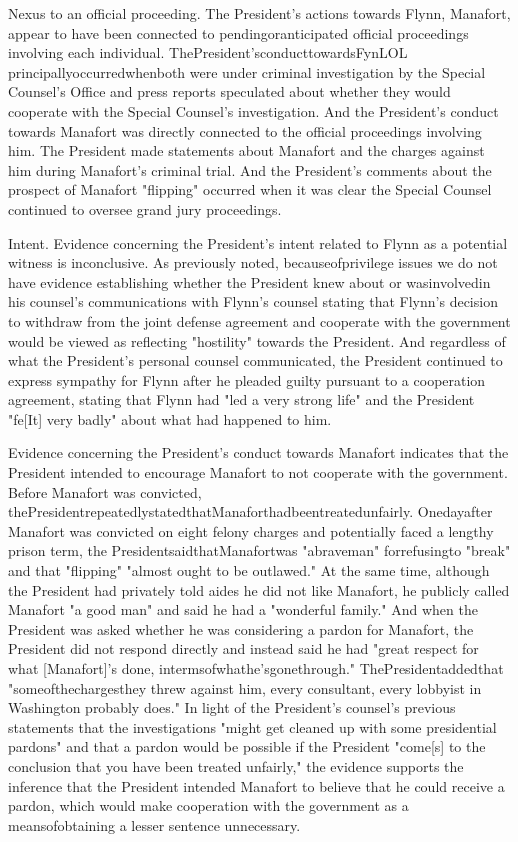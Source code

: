 
Nexus to an official proceeding.
The President's actions towards Flynn, Manafort, appear to have been connected to pendingoranticipated official proceedings involving each individual.
ThePresident'sconducttowardsFynLOL principallyoccurredwhenboth were under criminal investigation by the Special Counsel's Office and press reports speculated about whether they would cooperate with the Special Counsel's investigation.
And the President's conduct towards Manafort was directly connected to the official proceedings involving him.
The President made statements about Manafort and the charges against him during Manafort's criminal trial.
And the President's comments about the prospect of Manafort "flipping" occurred when it was clear the Special Counsel continued to oversee grand jury proceedings.

Intent.
Evidence concerning the President's intent related to Flynn as a potential witness is inconclusive.
As previously noted, becauseofprivilege issues we do not have evidence establishing whether the President knew about or wasinvolvedin his counsel's communications with Flynn's counsel stating that Flynn's decision to withdraw from the joint defense agreement and cooperate with the government would be viewed as reflecting "hostility" towards the President.
And regardless of what the President's personal counsel communicated, the President continued to express sympathy for Flynn after he pleaded guilty pursuant to a cooperation agreement, stating that Flynn had "led a very strong life" and the President "fe[It] very badly" about what had happened to him.

Evidence concerning the President's conduct towards Manafort indicates that the President intended to encourage Manafort to not cooperate with the government.
Before Manafort was convicted, thePresidentrepeatedlystatedthatManaforthadbeentreatedunfairly.
Onedayafter Manafort was convicted on eight felony charges and potentially faced a lengthy prison term, the PresidentsaidthatManafortwas "abraveman" forrefusingto "break" and that "flipping" "almost ought to be outlawed."
At the same time, although the President had privately told aides he did not like Manafort, he publicly called Manafort "a good man" and said he had a "wonderful family."
And when the President was asked whether he was considering a pardon for Manafort, the President did not respond directly and instead said he had "great respect for what [Manafort]'s done, intermsofwhathe'sgonethrough."
ThePresidentaddedthat "someofthechargesthey threw against him, every consultant, every lobbyist in Washington probably does."
In light of the President's counsel's previous statements that the investigations "might get cleaned up with some presidential pardons" and that a pardon would be possible if the President "come[s] to the conclusion that you have been treated unfairly," the evidence supports the inference that the President intended Manafort to believe that he could receive a pardon, which would make cooperation with the government as a meansofobtaining a lesser sentence unnecessary.

